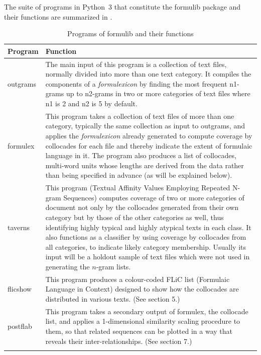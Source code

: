\documentclass[output=paper]{langscibook}
\begin{document}
The suite of programs in Python~3 that constitute the formulib package and their functions are summarized in .

\begin{table}
\caption{Programs of formulib and their functions\label{tab:forsyth:3}}
\begin{tabularx}{\textwidth}{>{\ttfamily}lQ}
\lsptoprule
Program & Function\\
\midrule
outgrams & The main input of this program is a collection of text files, normally divided into more than one text category. It compiles the components of a \textit{formulexicon} by finding the most frequent n1-grams up to n2-grams in two or more categories of text files where n1 is 2 and n2 is 5 by default.\\
formulex & This program takes a collection of text files of more than one category, typically the same collection as input to outgrams, and applies the \textit{formulexicon} already generated to compute coverage by collocades for each file and thereby indicate the extent of formulaic language in it. The program also produces a list of collocades, multi-word units whose lengths are derived from the data rather than being specified in advance (as will be explained below).\\
taverns & This program (Textual Affinity Values Employing Repeated N-gram Sequences) computes coverage of two or more categories of document not only by the collocades generated from their own category but by those of the other categories as well, thus identifying highly typical and highly atypical texts in each class. It also functions as a classifier by using coverage by collocades from all categories, to indicate likely category membership. Usually its input will be a holdout sample of text files which were not used in generating the $n$-gram lists.\\
flicshow & This program produces a colour-coded FLiC list (Formulaic Language in Context) designed to show how the collocades are distributed in various texts. (See section 5.)\\
postflab & This program takes a secondary output of formulex, the collocade list, and applies a 1-dimensional similarity scaling procedure to them, so that related sequences can be plotted in a way that reveals their inter-relationships. (See section 7.)\\
\lspbottomrule
\end{tabularx}
\end{table}
\end{document}
